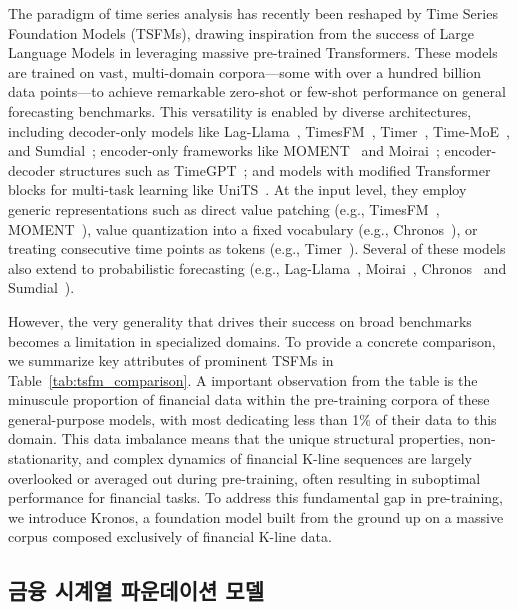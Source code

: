 The paradigm of time series analysis has recently been reshaped by Time Series Foundation Models (TSFMs), drawing inspiration from the success of Large Language Models in leveraging massive pre-trained Transformers. These models are trained on vast, multi-domain corpora—some with over a hundred billion data points—to achieve remarkable zero-shot or few-shot performance on general forecasting benchmarks. This versatility is enabled by diverse architectures, including decoder-only models like Lag-Llama~\cite{rasul2023lag}, TimesFM~\cite{das2024decoder}, Timer~\cite{liu2024timer}, Time-MoE~\cite{xiaoming2025time}, and Sumdial~\cite{liu2025sundial}; encoder-only frameworks like MOMENT~\cite{goswami2024moment} and Moirai~\cite{woo2024unified}; encoder-decoder structures such as TimeGPT~\cite{garza2023timegpt}; and models with modified Transformer blocks for multi-task learning like UniTS~\cite{gao2024units}. At the input level, they employ generic representations such as direct value patching (e.g., TimesFM~\cite{das2024decoder}, MOMENT~\cite{goswami2024moment}), value quantization into a fixed vocabulary (e.g., Chronos~\cite{ansari2024chronos}), or treating consecutive time points as tokens (e.g., Timer~\cite{liu2024timer}). Several of these models also extend to probabilistic forecasting (e.g., Lag-Llama~\cite{rasul2023lag}, Moirai~\cite{woo2024unified}, Chronos~\cite{ansari2024chronos} and Sumdial~\cite{liu2025sundial}).

However, the very generality that drives their success on broad benchmarks becomes a limitation in specialized domains. To provide a concrete comparison, we summarize key attributes of prominent TSFMs in Table~\ref{tab:tsfm_comparison}. A important observation from the table is the minuscule proportion of financial data within the pre-training corpora of these general-purpose models, with most dedicating less than 1\% of their data to this domain. This data imbalance means that the unique structural properties, non-stationarity, and complex dynamics of financial K-line sequences are largely overlooked or averaged out during pre-training, often resulting in suboptimal performance for financial tasks. To address this fundamental gap in pre-training, we introduce Kronos, a foundation model built from the ground up on a massive corpus composed exclusively of financial K-line data.

\subsection{금융 시계열 파운데이션 모델}

